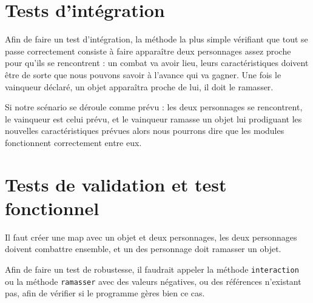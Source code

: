 \documentclass[12pt,a4paper,openany]{book}
\begin{document}
		\section{Tests d'intégration}
		Afin de faire un test d'intégration, la méthode la plus simple vérifiant que tout se passe correctement consiste à faire apparaître deux personnages
		assez proche pour qu'ils se rencontrent : un combat va avoir lieu, leurs caractéristiques doivent être de sorte que nous pouvons savoir à l'avance qui va
		gagner. Une fois le vainqueur déclaré, un objet apparaîtra proche de lui, il doit le ramasser.

		Si notre scénario se déroule comme prévu : les deux personnages se rencontrent, le vainqueur est celui prévu, et le vainqueur ramasse un objet lui
		prodiguant les nouvelles caractéristiques prévues alors nous pourrons dire que les modules fonctionnent correctement entre eux.

		\section{Tests de validation et test fonctionnel}
		Il faut créer une map avec un objet et deux personnages, les deux personnages doivent combattre ensemble, et un des personnage doit ramasser un objet.

		Afin de faire un test de robustesse, il faudrait appeler la méthode \texttt{interaction} ou la méthode \texttt{ramasser} avec des valeurs négatives, ou
		des références n'existant pas, afin de vérifier si le programme gères bien ce cas.
\end{document}
